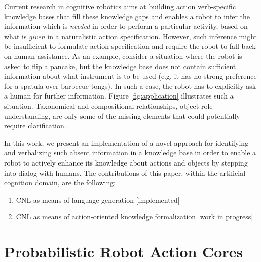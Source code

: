 \documentclass[oribibl]{llncs}
\begin{document}
Current research in cognitive robotics aims at building action 
verb-specific knowledge bases that fill these knowledge gaps and 
enables a robot to infer the information which is \textit{needed} in 
order to perform a particular activity, based on what is \textit 
{given} in a naturalistic action specification. However, such 
inference might be insufficient to formulate action specification and require 
the robot to fall back on human assistance. As an example, consider a situation where 
the robot is asked to flip a pancake, but the knowledge base does 
not contain sufficient information about what instrument is to be used 
(e.g. it has no strong preference for a spatula over barbecue 
tongs). In such a case, the robot has to explicitly ask a human for 
further information. Figure \ref{fig:application} illustrates such a 
situation. Taxonomical and compositional relationships, object role 
understanding, are only some of the missing elements that could 
potentially require clarification. 

In this work, we present an implementation of a novel approach for 
identifying and verbalizing such absent information in a knowledge
 base in order to enable a robot to actively enhance its knowledge
  about actions and objects by stepping into dialog with humans.
The contributions of this paper, within the artificial cognition domain,
 are the following:
\begin{enumerate}
    \item CNL as means of language generation [implemented]
    \item CNL as means of action-oriented knowledge formalization [work in progress]
\end{enumerate}

\section{Probabilistic Robot Action Cores}
\end{document}
